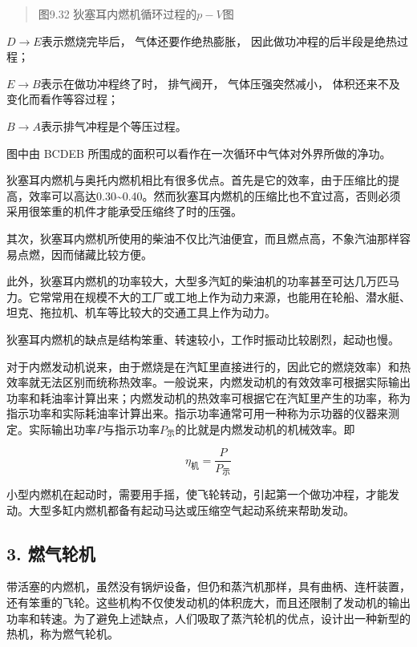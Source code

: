 \begin{quote}
图9.32 狄塞耳内燃机循环过程的\(p - V\)图
\end{quote}

\(D \rightarrow E\)表示燃烧完毕后， 气体还要作绝热膨胀，
因此做功冲程的后半段是绝热过程；

\(E \rightarrow B\)表示在做功冲程终了时， 排气阀开， 气体压强突然减小，
体积还来不及变化而看作等容过程；

\(B \rightarrow A\)表示排气冲程是个等压过程。

图中由 BCDEB 所围成的面积可以看作在一次循环中气体对外界所做的净功。

狄塞耳内燃机与奥托内燃机相比有很多优点。首先是它的效率，由于压缩比的提高，效率可以高达0.30\textasciitilde0.40。然而狄塞耳内燃机的压缩比也不宜过高，否则必须采用很笨重的机件才能承受压缩终了时的压强。

其次，狄塞耳内燃机所使用的柴油不仅比汽油便宜，而且燃点高，不象汽油那样容易点燃，因而储藏比较方便。

此外，狄塞耳内燃机的功率较大，大型多汽缸的柴油机的功率甚至可达几万匹马力。它常常用在规模不大的工厂或工地上作为动力来源，也能用在轮船、潜水艇、坦克、拖拉机、机车等比较大的交通工具上作为动力。

狄塞耳内燃机的缺点是结构笨重、转速较小，工作时振动比较剧烈，起动也慢。

对于内燃发动机说来，由于燃烧是在汽缸里直接进行的，因此它的燃烧效率）和热效率就无法区别而统称热效率。一般说来，内燃发动机的有效效率可根据实际输出功率和耗油率计算出来；内燃发动机的热效率可根据它在汽缸里产生的功率，称为指示功率和实际耗油率计算出来。指示功率通常可用一种称为示功器的仪器来测定。实际输出功率\(P\)与指示功率\(P_{\text{示}}\)的比就是内燃发动机的机械效率。即

\[
\eta_{\mathrm{机}}=\frac{P}{P_{\mathrm{示}}} \tag{9.21}
\]

小型内燃机在起动时，需要用手摇，使飞轮转动，引起第一个做功冲程，才能发动。大型多缸内燃机都备有起动马达或压缩空气起动系统来帮助发动。

\subsection{3. 燃气轮机}\label{ux71c3ux6c14ux8f6eux673a}

带活塞的内燃机，虽然没有锅炉设备，但仍和蒸汽机那样，具有曲柄、连杆装置，还有笨重的飞轮。这些机构不仅使发动机的体积庞大，而且还限制了发动机的输出功率和转速。为了避免上述缺点，人们吸取了蒸汽轮机的优点，设计出一种新型的热机，称为燃气轮机。

